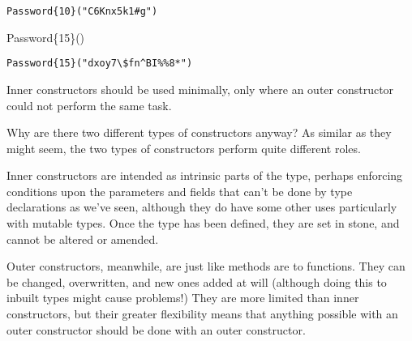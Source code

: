 \documentclass[
  letterpaper,
  DIV=11,
  numbers=noendperiod]{scrreprt}
\newenvironment{Shaded}{\begin{snugshade}}{\end{snugshade}}
\newcommand{\DataTypeTok}[1]{\textcolor[rgb]{0.68,0.00,0.00}{#1}}
\newcommand{\FunctionTok}[1]{\textcolor[rgb]{0.28,0.35,0.67}{#1}}
\newcommand{\NormalTok}[1]{\textcolor[rgb]{0.00,0.23,0.31}{#1}}
\begin{document}
\begin{verbatim}
Password{10}("C6Knx5k1#g")
\end{verbatim}

\begin{Shaded}
\begin{Highlighting}[]
\FunctionTok{Password}\DataTypeTok{\{15\}}\NormalTok{()}
\end{Highlighting}
\end{Shaded}

\begin{verbatim}
Password{15}("dxoy7\$fn^BI%%8*")
\end{verbatim}

\begin{tcolorbox}[enhanced jigsaw, toprule=.15mm, opacitybacktitle=0.6, leftrule=.75mm, breakable, coltitle=black, bottomrule=.15mm, colbacktitle=quarto-callout-tip-color!10!white, bottomtitle=1mm, rightrule=.15mm, title=\textcolor{quarto-callout-tip-color}{\faLightbulb}\hspace{0.5em}{Convention}, colframe=quarto-callout-tip-color-frame, left=2mm, colback=white, opacityback=0, arc=.35mm, toptitle=1mm, titlerule=0mm]

Inner constructors should be used minimally, only where an outer
constructor could not perform the same task.

\end{tcolorbox}

\begin{tcolorbox}[enhanced jigsaw, toprule=.15mm, opacitybacktitle=0.6, leftrule=.75mm, breakable, coltitle=black, bottomrule=.15mm, colbacktitle=quarto-callout-note-color!10!white, bottomtitle=1mm, rightrule=.15mm, title=\textcolor{quarto-callout-note-color}{\faInfo}\hspace{0.5em}{Note}, colframe=quarto-callout-note-color-frame, left=2mm, colback=white, opacityback=0, arc=.35mm, toptitle=1mm, titlerule=0mm]

Why are there two different types of constructors anyway? As similar as
they might seem, the two types of constructors perform quite different
roles.

Inner constructors are intended as intrinsic parts of the type, perhaps
enforcing conditions upon the parameters and fields that can't be done
by type declarations as we've seen, although they do have some other
uses particularly with mutable types. Once the type has been defined,
they are set in stone, and cannot be altered or amended.

Outer constructors, meanwhile, are just like methods are to functions.
They can be changed, overwritten, and new ones added at will (although
doing this to inbuilt types might cause problems!) They are more limited
than inner constructors, but their greater flexibility means that
anything possible with an outer constructor should be done with an outer
constructor.

\end{tcolorbox}
\end{document}
